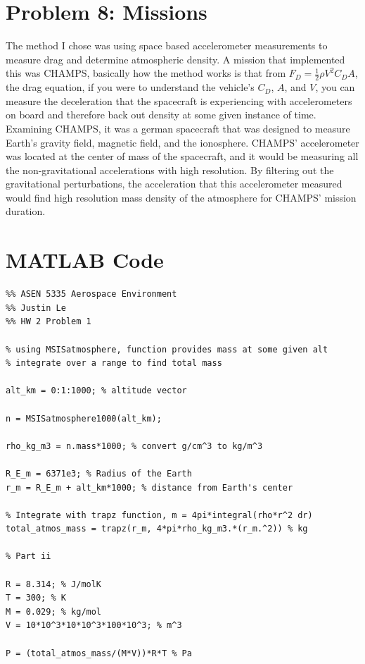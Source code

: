 \documentclass[11pt]{article}
\begin{document}
\section*{Problem 8: Missions}
\hspace*{2em} The method I chose was using space based accelerometer measurements to measure drag and determine atmospheric density.
A mission that implemented this was CHAMPS, basically how the method works is that from $F_D = \tfrac12\rho V^2 C_D A$,
the drag equation, if you were to understand the vehicle's $C_D$, $A$, and $V$, you can measure the deceleration that the
spacecraft is experiencing with accelerometers on board and therefore back out density at some given instance of time. Examining
CHAMPS, it was a german spacecraft that was designed to measure Earth's gravity field, magnetic field, and the ionosphere. CHAMPS'
accelerometer was located at the center of mass of the spacecraft, and it would be measuring all the non-gravitational accelerations with high resolution.
By filtering out the gravitational perturbations, the acceleration that this accelerometer measured would find high resolution mass density of the
atmosphere for CHAMPS' mission duration.

\newpage
\section*{MATLAB Code}

\begin{lstlisting}
%% ASEN 5335 Aerospace Environment
%% Justin Le
%% HW 2 Problem 1

% using MSISatmosphere, function provides mass at some given alt
% integrate over a range to find total mass

alt_km = 0:1:1000; % altitude vector

n = MSISatmosphere1000(alt_km);

rho_kg_m3 = n.mass*1000; % convert g/cm^3 to kg/m^3

R_E_m = 6371e3; % Radius of the Earth
r_m = R_E_m + alt_km*1000; % distance from Earth's center

% Integrate with trapz function, m = 4pi*integral(rho*r^2 dr)
total_atmos_mass = trapz(r_m, 4*pi*rho_kg_m3.*(r_m.^2)) % kg

% Part ii

R = 8.314; % J/molK
T = 300; % K
M = 0.029; % kg/mol
V = 10*10^3*10*10^3*100*10^3; % m^3

P = (total_atmos_mass/(M*V))*R*T % Pa
\end{lstlisting}
\end{document}
